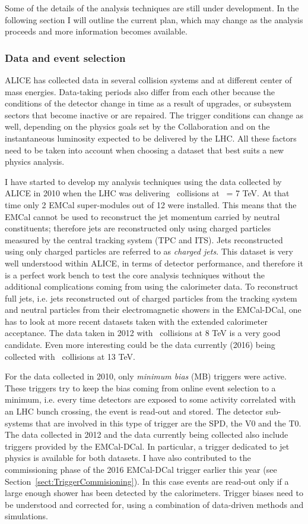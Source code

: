 \documentclass[a4paper]{jpconf}
\begin{document}
Some of the details of the analysis techniques are still under development. In the following section
I will outline the current plan, which may change as the analysis proceeds and more information becomes available.

\subsubsection{Data and event selection}
ALICE has collected data in several collision systems and at different center of mass energies.
Data-taking periods also differ from each other because the conditions of the detector change in time as a result of upgrades,
or subsystem sectors that become inactive or are repaired. The trigger conditions can change as well, depending on the
physics goals set by the Collaboration and on the instantaneous luminosity expected to be delivered by the LHC.
All these factors need to be taken into account when choosing a dataset that best suits a new physics analysis.

I have started to develop my analysis techniques using the data collected by ALICE in 2010 when the LHC was
delivering \pp\ collisions at \s\ = 7 TeV. At that time only 2 EMCal super-modules out of 12 were installed.
This means that the EMCal cannot be used to reconstruct the jet momentum carried by neutral constituents; therefore jets are
reconstructed only using charged particles measured by the central tracking system (TPC and ITS).
Jets reconstructed using only charged particles are referred to as \emph{charged jets}. This dataset is very
well understood within ALICE, in terms of detector performance, and therefore it is a perfect work bench
to test the core analysis techniques without the additional complications coming from using the calorimeter data.
To reconstruct full jets, i.e. jets reconstructed out of charged particles from the tracking system and neutral particles from their
electromagnetic showers in the EMCal-DCal, one has to look at more recent datasets taken with the extended calorimeter acceptance.
The data taken in 2012 with \pp\ collisions at 8 TeV is a very good candidate. Even more interesting could be the data currently (2016)
being collected with \pp\ collisions at 13 TeV.

For the data collected in 2010, only \emph{minimum bias} (MB) triggers were active. These triggers
try to keep the bias coming from online event selection to a minimum, i.e. every time detectors
are exposed to some activity correlated with an LHC bunch crossing, the event is read-out and stored.
The detector sub-systems that are involved in this type of trigger are the SPD, the V0 and the T0.
The data collected in 2012 and the data currently being collected also include triggers
provided by the EMCal-DCal. In particular, a trigger dedicated to jet physics is available for both datasets. 
I have also contributed to the commissioning phase of the 2016 EMCal-DCal trigger earlier this year (see Section~\ref{sect:TriggerCommisioning}).
In this case events are read-out only if a large enough shower has been detected by the calorimeters.
Trigger biases need to be understood and corrected for, using a combination of data-driven methods and simulations.
\end{document}
